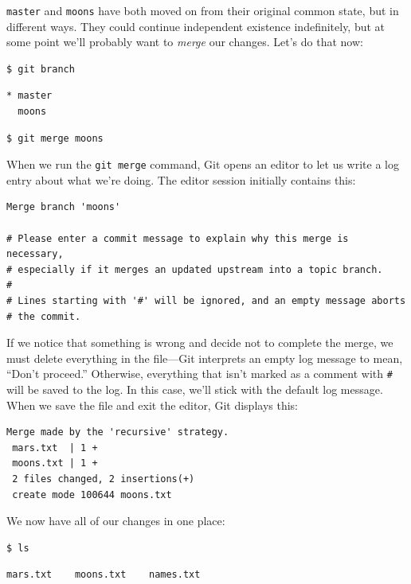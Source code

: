 \documentclass[]{book}
\newcommand{\gdef}[2]{\emph{#2}}
\begin{document}
\texttt{master} and \texttt{moons} have both moved on from their
original common state, but in different ways. They could continue
independent existence indefinitely, but at some point we'll probably
want to \gdef{g:merge}{merge} our changes. Let's do that now:

\begin{verbatim}
$ git branch
\end{verbatim}

\begin{verbatim}
* master
  moons
\end{verbatim}

\begin{verbatim}
$ git merge moons
\end{verbatim}

When we run the \texttt{git merge} command, Git opens an editor to let
us write a log entry about what we're doing. The editor session
initially contains this:

\begin{verbatim}
Merge branch 'moons'

# Please enter a commit message to explain why this merge is necessary,
# especially if it merges an updated upstream into a topic branch.
#
# Lines starting with '#' will be ignored, and an empty message aborts
# the commit.
\end{verbatim}

If we notice that something is wrong and decide not to complete the
merge, we must delete everything in the file---Git interprets an empty
log message to mean, ``Don't proceed.'' Otherwise, everything that isn't
marked as a comment with \texttt{\#} will be saved to the log. In this
case, we'll stick with the default log message. When we save the file
and exit the editor, Git displays this:

\begin{verbatim}
Merge made by the 'recursive' strategy.
 mars.txt  | 1 +
 moons.txt | 1 +
 2 files changed, 2 insertions(+)
 create mode 100644 moons.txt
\end{verbatim}

We now have all of our changes in one place:

\begin{verbatim}
$ ls
\end{verbatim}

\begin{verbatim}
mars.txt    moons.txt    names.txt
\end{verbatim}
\end{document}
